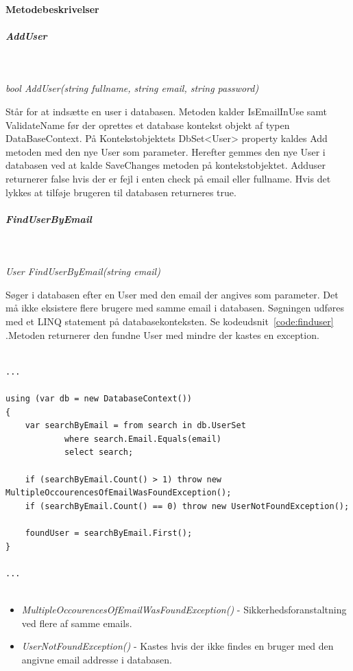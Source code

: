 
\paragraph{Metodebeskrivelser}

\subparagraph{AddUser}\

\textit{bool AddUser(string fullname, string email, string password)}

Står for at indsætte en user i databasen. Metoden kalder IsEmailInUse samt ValidateName før der oprettes et database kontekst objekt af typen DataBaseContext. På Kontekstobjektets DbSet<User> property kaldes Add metoden med den nye User som parameter. Herefter gemmes den nye User i databasen ved at kalde SaveChanges metoden på kontekstobjektet. Adduser returnerer false hvis der er fejl i enten check på email eller fullname. Hvis det lykkes at tilføje brugeren til databasen returneres true.

\subparagraph{FindUserByEmail}\

\textit{User FindUserByEmail(string email)}

Søger i databasen efter en User med den email der angives som parameter. Det må ikke eksistere flere brugere med samme email i databasen. Søgningen udføres med et LINQ statement på databasekonteksten. Se kodeudsnit~\ref{code:finduser} .Metoden returnerer den fundne User med mindre der kastes en exception.

\begin{lstlisting}[caption=Kodeudsnit fra metoden FindUserByEmail, label=code:finduser]

...

using (var db = new DatabaseContext())
{
	var searchByEmail = from search in db.UserSet
			where search.Email.Equals(email)
			select search;

	if (searchByEmail.Count() > 1) throw new    MultipleOccourencesOfEmailWasFoundException();
	if (searchByEmail.Count() == 0) throw new UserNotFoundException();

	foundUser = searchByEmail.First();
}

...
	
\end{lstlisting}

\begin{itemize}
	\item \textit{MultipleOccourencesOfEmailWasFoundException()} - Sikkerhedsforanstaltning ved flere af samme emails.
	\item \textit{UserNotFoundException()} - Kastes hvis der ikke findes en bruger med den angivne email addresse i databasen.
\end{itemize}

